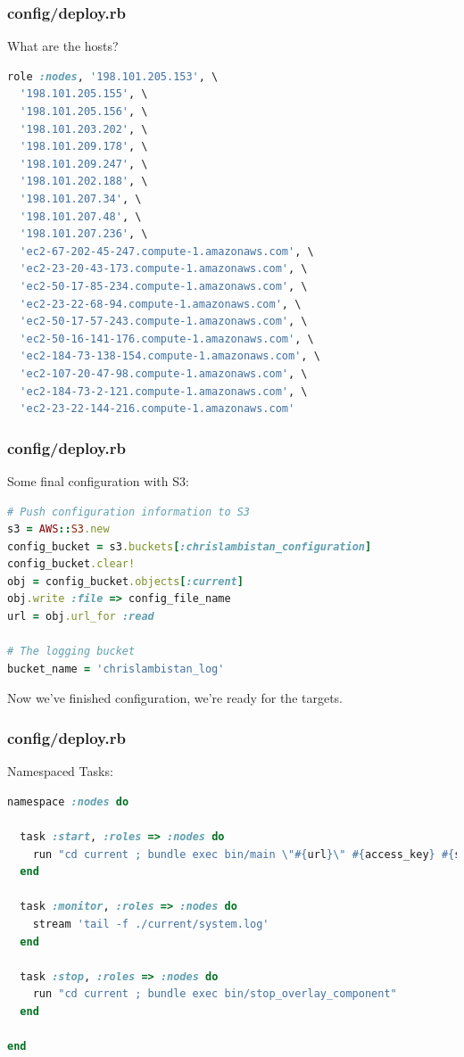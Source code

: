 \documentclass[t,handout]{beamer}
\begin{document}
\begin{frame}[fragile]
\frametitle{config/deploy.rb}
What are the hosts?
\begin{lstlisting}[frame=none,
  language=Ruby,
  basicstyle=\tiny\ttfamily\color{black},
  commentstyle=\tiny\ttfamily\color{red},
  stringstyle=\tiny\ttfamily\color{violet}]
role :nodes, '198.101.205.153', \
  '198.101.205.155', \
  '198.101.205.156', \
  '198.101.203.202', \
  '198.101.209.178', \
  '198.101.209.247', \
  '198.101.202.188', \
  '198.101.207.34', \
  '198.101.207.48', \
  '198.101.207.236', \
  'ec2-67-202-45-247.compute-1.amazonaws.com', \
  'ec2-23-20-43-173.compute-1.amazonaws.com', \
  'ec2-50-17-85-234.compute-1.amazonaws.com', \
  'ec2-23-22-68-94.compute-1.amazonaws.com', \
  'ec2-50-17-57-243.compute-1.amazonaws.com', \
  'ec2-50-16-141-176.compute-1.amazonaws.com', \
  'ec2-184-73-138-154.compute-1.amazonaws.com', \
  'ec2-107-20-47-98.compute-1.amazonaws.com', \
  'ec2-184-73-2-121.compute-1.amazonaws.com', \
  'ec2-23-22-144-216.compute-1.amazonaws.com'
\end{lstlisting}
\end{frame}

\begin{frame}[fragile]
\frametitle{config/deploy.rb}
Some final configuration with S3:
\begin{lstlisting}[frame=none,
  language=Ruby,
  basicstyle=\scriptsize\ttfamily\color{black},
  commentstyle=\scriptsize\ttfamily\color{red},
  stringstyle=\scriptsize\ttfamily\color{violet}]
# Push configuration information to S3
s3 = AWS::S3.new
config_bucket = s3.buckets[:chrislambistan_configuration]
config_bucket.clear!
obj = config_bucket.objects[:current]
obj.write :file => config_file_name
url = obj.url_for :read

# The logging bucket
bucket_name = 'chrislambistan_log'
\end{lstlisting}
Now we've finished configuration, we're ready for the targets.
\end{frame}

\begin{frame}[fragile]
\frametitle{config/deploy.rb}
Namespaced Tasks:
\begin{lstlisting}[frame=none,
  language=Ruby,
  basicstyle=\scriptsize\ttfamily\color{black},
  commentstyle=\scriptsize\ttfamily\color{red},
  stringstyle=\scriptsize\ttfamily\color{violet}]
namespace :nodes do

  task :start, :roles => :nodes do
    run "cd current ; bundle exec bin/main \"#{url}\" #{access_key} #{secret_key} #{bucket_name}"
  end

  task :monitor, :roles => :nodes do
    stream 'tail -f ./current/system.log'
  end
  
  task :stop, :roles => :nodes do
    run "cd current ; bundle exec bin/stop_overlay_component"
  end

end

\end{lstlisting}
\end{frame}
\end{document}
